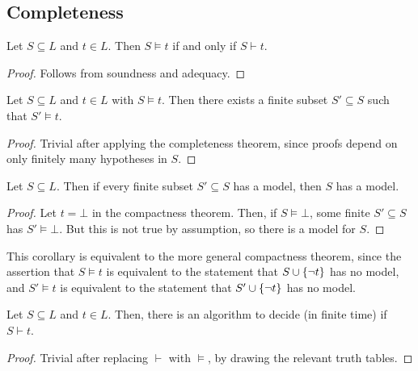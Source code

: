 \subsection{Completeness}
\begin{theorem}
    Let \( S \subseteq L \) and \( t \in L \).
    Then \( S \models t \) if and only if \( S \vdash t \).
\end{theorem}
\begin{proof}
    Follows from soundness and adequacy.
\end{proof}
\begin{theorem}
    Let \( S \subseteq L \) and \( t \in L \) with \( S \models t \).
    Then there exists a finite subset \( S' \subseteq S \) such that \( S' \models t \).
\end{theorem}
\begin{proof}
    Trivial after applying the completeness theorem, since proofs depend on only finitely many hypotheses in \( S \).
\end{proof}
\begin{corollary}
    Let \( S \subseteq L \).
    Then if every finite subset \( S' \subseteq S \) has a model, then \( S \) has a model.
\end{corollary}
\begin{proof}
    Let \( t = \bot \) in the compactness theorem.
    Then, if \( S \models \bot \), some finite \( S' \subseteq S \) has \( S' \models \bot \).
    But this is not true by assumption, so there is a model for \( S \).
\end{proof}
\begin{remark}
    This corollary is equivalent to the more general compactness theorem, since the assertion that \( S \models t \) is equivalent to the statement that \( S \cup \qty{\neg t} \) has no model, and \( S' \models t \) is equivalent to the statement that \( S' \cup \qty{\neg t} \) has no model.
\end{remark}
\begin{theorem}
    Let \( S \subseteq L \) and \( t \in L \).
    Then, there is an algorithm to decide (in finite time) if \( S \vdash t \).
\end{theorem}
\begin{proof}
    Trivial after replacing \( \vdash \) with \( \models \), by drawing the relevant truth tables.
\end{proof}
